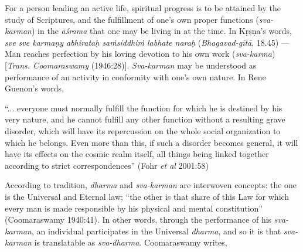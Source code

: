 For a person leading an active life, spiritual progress is to be attained by the study of Scriptures, and the fulfillment of one’s own proper functions ({\sl sva-karman}) in the {\sl āśrama} that one may be living in at the time. In Kṛṣṇa’s words, {\sl sve sve karmaṇy abhirataḥ saṁsiddhiṁ labhate naraḥ} ({\sl Bhagavad-gītā}, 18.45) — Man reaches perfection by his loving devotion to his own work ({\sl sva-karma}) [{\sl Trans. Coomaraswamy} (1946:28)]. {\sl Sva-karman} may be understood as performance of an activity in conformity with one’s own nature. In Rene Guenon’s words, 

\begin{myquote}
“... everyone must normally fulfill the function for which he is destined by his very nature, and he cannot fulfill any other function without a resulting grave disorder, which will have its repercussion on the whole social organization to which he belongs. Even more than this, if such a disorder becomes general, it will have its effects on the cosmic realm itself, all things being linked together according to strict correspondences”
\hfill (Fohr {\sl et al} 2001:58)  
\end{myquote}

According to tradition, {\sl dharma} and {\sl sva-karman} are interwoven concepts: the one is the Universal and Eternal law; “the other is that share of this Law for which every man is made responsible by his physical and mental constitution” (Coomaraswamy 1940:41). In other words, through the performance of his {\sl sva-karman}, an individual participates in the Universal {\sl dharma}, and so it is that {\sl sva-karman} is translatable as {\sl sva-dharma}. Coomaraswamy writes, 

